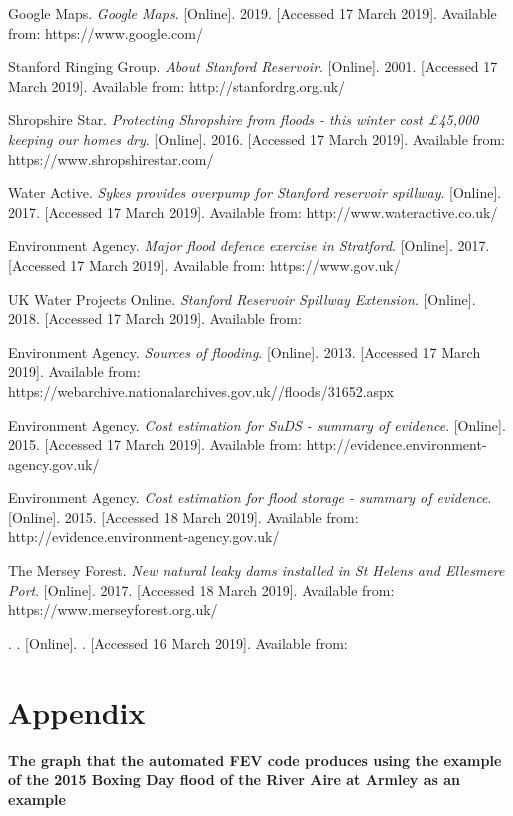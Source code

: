 \documentclass[11pt,a4paper]{article}
\begin{document}
\begin{thebibliography}{}
Google Maps. \textit{Google Maps}. [Online]. 2019. [Accessed 17 March 2019]. Available from: https://www.google.com/

Stanford Ringing Group. \textit{About Stanford Reservoir}. [Online]. 2001. [Accessed 17 March 2019]. Available from: http://stanfordrg.org.uk/

Shropshire Star. \textit{Protecting Shropshire from floods - this winter cost £45,000 keeping our homes dry}. [Online]. 2016. [Accessed 17 March 2019]. Available from: https://www.shropshirestar.com/

Water Active. \textit{Sykes provides overpump for Stanford reservoir spillway}. [Online]. 2017. [Accessed 17 March 2019]. Available from: http://www.wateractive.co.uk/

Environment Agency. \textit{Major flood defence exercise in Stratford}. [Online]. 2017. [Accessed 17 March 2019]. Available from: https://www.gov.uk/

UK Water Projects Online. \textit{Stanford Reservoir Spillway Extension}. [Online]. 2018. [Accessed 17 March 2019]. Available from:

Environment Agency. \textit{Sources of flooding}. [Online]. 2013. [Accessed 17 March 2019]. Available from: https://webarchive.nationalarchives.gov.uk//floods/31652.aspx

Environment Agency. \textit{Cost estimation for SuDS - summary of evidence}. [Online]. 2015. [Accessed 17 March 2019]. Available from: http://evidence.environment-agency.gov.uk/

Environment Agency. \textit{Cost estimation for flood storage - summary of evidence}. [Online]. 2015. [Accessed 18 March 2019]. Available from: http://evidence.environment-agency.gov.uk/

The Mersey Forest. \textit{New natural leaky dams installed in St Helens and Ellesmere Port}. [Online]. 2017. [Accessed 18 March 2019]. Available from: https://www.merseyforest.org.uk/

\bibitem{}
. \textit{}. [Online]. . [Accessed 16 March 2019]. Available from:
\end{thebibliography}


\newpage
\appendix
\section{Appendix}
{\bf The graph that the automated FEV code produces using the example of the 2015 Boxing Day flood of the River Aire at Armley as an example}\\
\begin{figure}[H]
\begin{center}
\end{center}
\end{figure}
\end{document}

